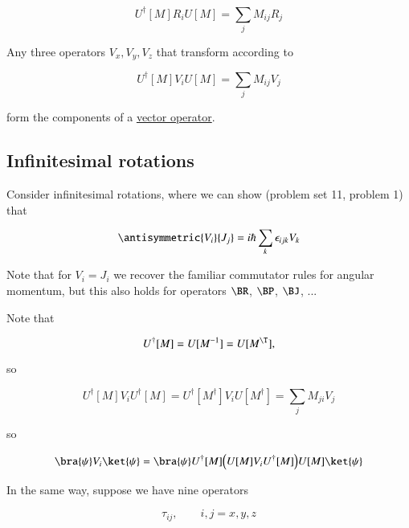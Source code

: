\begin{equation}\label{eqn:qmTwoL19:50}
U^\dagger[M] R_i U[M] = \sum_j M_{ij} R_j
\end{equation}

Any three operators $V_x, V_y, V_z$ that transform according to

\begin{equation}\label{eqn:qmTwoL19:70}
U^\dagger[M] V_i U[M] = \sum_j M_{ij} V_j
\end{equation}

form the components of a \underline{vector operator}.

\subsection{Infinitesimal rotations}

Consider infinitesimal rotations, where we can show (problem set 11, problem 1) that 

\begin{equation}\label{eqn:qmTwoL19:90}
\antisymmetric{V_i}{J_j} = i \hbar \sum_k \epsilon_{ijk} V_k
\end{equation}

Note that for $V_i = J_i$ we recover the familiar commutator rules for angular momentum, but this also holds for operators $\BR$, $\BP$, $\BJ$, ...

Note that

\begin{equation}\label{eqn:qmTwoL19:110}
U^\dagger[M] = U[M^{-1}] = U[M^\T],
\end{equation}

so

\begin{equation}\label{eqn:qmTwoL19:130}
U^\dagger[M] V_i U^\dagger[M] = U^\dagger[M^\dagger] V_i U[M^\dagger] = \sum_j M_{ji} V_j
\end{equation}

so

\begin{equation}\label{eqn:qmTwoL19:150}
\bra{\psi} V_i \ket{\psi}
=
\bra{\psi}
U^\dagger[M] \Bigl( U[M] V_i U^\dagger[M] \Bigr) U[M]
\ket{\psi}
\end{equation}

In the same way, suppose we have nine operators

\begin{equation}\label{eqn:qmTwoL19:170}
\tau_{ij}, \qquad i, j = x, y, z
\end{equation}

